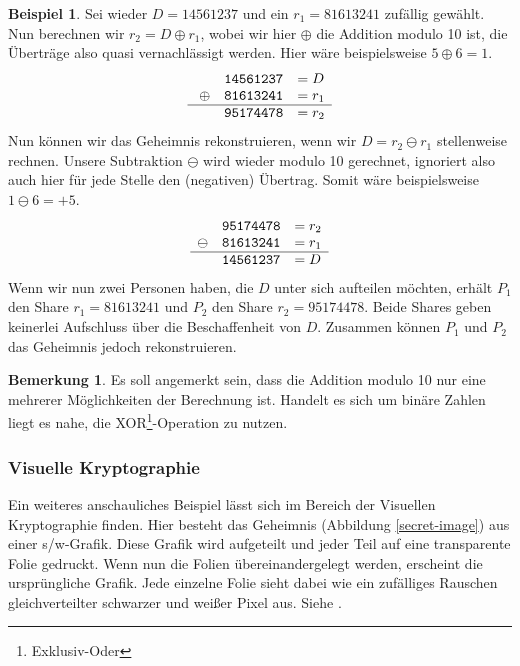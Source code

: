 \documentclass[12pt, a4paper, oneside, titlepage]{report}
\theoremstyle{definition}
\newtheorem{bem}[lemma]{Bemerkung}
\newtheorem{bsp}[lemma]{Beispiel}
\begin{document}
	\begin{bsp}
	Sei wieder $ D = 14561237 $ und ein $ r_1 = 81613241 $ zufällig gewählt. Nun berechnen wir $ r_2 = D \oplus r_1 $, wobei wir hier $ \oplus $ die Addition modulo 10 ist, die Überträge also quasi vernachlässigt werden. Hier wäre beispielsweise $ 5 \oplus 6 = 1 $.
	$$\begin{array}{ccl}
 	 & \mathtt{14561237} & = D \\\
	\oplus & \mathtt{81613241} & = r_1 \\\hline
 	 & \mathtt{95174478} & = r_2 
	\end{array}$$
	Nun können wir das Geheimnis rekonstruieren, wenn wir $ D = r_2 \ominus r_1 $ stellenweise rechnen. Unsere Subtraktion $ \ominus $ wird wieder modulo 10 gerechnet, ignoriert also auch hier für jede Stelle den (negativen) Übertrag. Somit wäre beispielsweise $ 1 \ominus 6 = + 5 $.
	$$\begin{array}{ccl}
	 & \mathtt{95174478} & = r_2 \\
	\ominus & \mathtt{81613241} & = r_1 \\\hline
	 & \mathtt{14561237} & = D
	\end{array}$$
	Wenn wir nun zwei Personen haben, die $ D $ unter sich aufteilen möchten, erhält $ P_1 $ den Share $ r_1 = 81613241 $ und $ P_2 $ den Share $ r_2 = 95174478$. Beide Shares geben keinerlei Aufschluss über die Beschaffenheit von $ D $. Zusammen können $ P_1 $ und $ P_2 $ das Geheimnis jedoch rekonstruieren.
	\end{bsp}

	\begin{bem}
		Es soll angemerkt sein, dass die Addition modulo 10 nur eine mehrerer Möglichkeiten der Berechnung ist. Handelt es sich um binäre Zahlen liegt es nahe, die XOR\footnote{Exklusiv-Oder}-Operation zu nutzen.
	\end{bem}
	
	\subsubsection{Visuelle Kryptographie}

	Ein weiteres anschauliches Beispiel lässt sich im Bereich der Visuellen Kryptographie finden. Hier besteht das Geheimnis (Abbildung \ref{secret-image}) aus einer s/w-Grafik. Diese Grafik wird aufgeteilt und jeder Teil auf eine transparente Folie gedruckt. Wenn nun die Folien übereinandergelegt werden, erscheint die ursprüngliche Grafik. Jede einzelne Folie sieht dabei wie ein zufälliges Rauschen gleichverteilter schwarzer und weißer Pixel aus. Siehe \cite{shamir_naor}.
	
\end{document}
